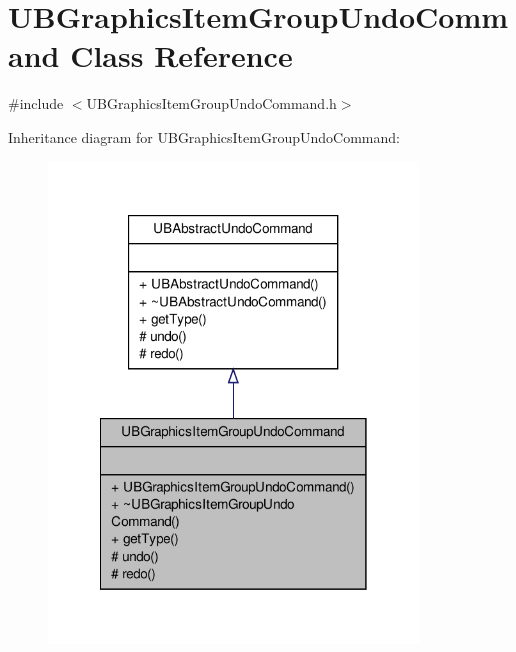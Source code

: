 \hypertarget{class_u_b_graphics_item_group_undo_command}{\section{U\-B\-Graphics\-Item\-Group\-Undo\-Command Class Reference}
\label{d6/d84/class_u_b_graphics_item_group_undo_command}
}


{\ttfamily \#include $<$U\-B\-Graphics\-Item\-Group\-Undo\-Command.\-h$>$}



Inheritance diagram for U\-B\-Graphics\-Item\-Group\-Undo\-Command\-:
\nopagebreak
\begin{figure}[H]
\begin{center}
\leavevmode
\includegraphics[width=278pt]{d8/dff/class_u_b_graphics_item_group_undo_command__inherit__graph}
\end{center}
\end{figure}


